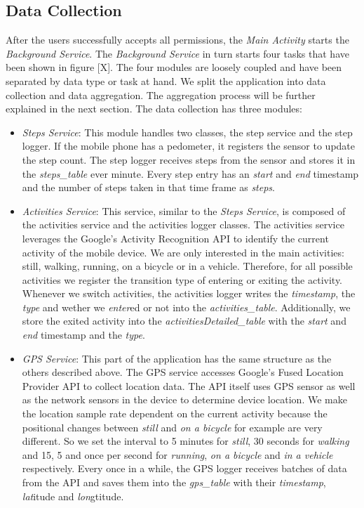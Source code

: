 \subsection{Data Collection}
After the users successfully accepts all permissions, the \textit{Main Activity} starts the \textit{Background Service}. The \textit{Background Service} in turn starts four tasks that have been shown in figure [X]. The four modules are loosely coupled and have been separated by data type or task at hand. We split the application into data collection and data aggregation. The aggregation process will be further explained in the next section. The data collection has three modules:
\begin{itemize}
	\item \textit{Steps Service}: This module handles two classes, the step service and the step logger. If the mobile phone has a pedometer, it registers the sensor to update the step count. The step logger receives steps from the sensor and stores it in the \textit{steps\_table} ever minute. Every step entry has an \textit{start} and \textit{end} timestamp and the number of steps taken in that time frame as \textit{steps}.
	\item \textit{Activities Service}: This service, similar to the \textit{Steps Service}, is composed of the activities service and the activities logger classes. The activities service leverages the Google's Activity Recognition API to identify the current activity of the mobile device. We are only interested in the main activities: still, walking, running, on a bicycle or in a vehicle. Therefore, for all possible activities we register the transition type of entering or exiting the activity. Whenever we switch activities, the activities logger writes the \textit{timestamp}, the \textit{type} and wether we \textit{enter}ed or not into the \textit{activities\_table}. Additionally, we store the exited activity into the \textit{activitiesDetailed\_table} with the \textit{start} and \textit{end} timestamp and the \textit{type}.
 	\item \textit{GPS Service}: This part of the application has the same structure as the others described above. The GPS service accesses Google's Fused Location Provider API to collect location data. The API itself uses GPS sensor as well as the network sensors in the device to determine device location. We make the location sample rate dependent on the current activity because the positional changes between \textit{still} and \textit{on a bicycle} for example are very different. So we set the interval to 5 minutes for \textit{still}, 30 seconds for \textit{walking} and 15, 5 and once per second for \textit{running}, \textit{on a bicycle} and \textit{in a vehicle} respectively. Every once in a while, the GPS logger receives batches of data from the API and saves them into the \textit{gps\_table} with their  \textit{timestamp}, \textit{lat}itude and \textit{lon}gtitude.
\end{itemize}


